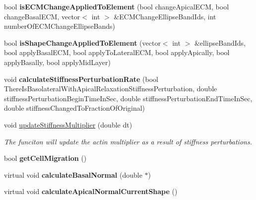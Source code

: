 \begin{DoxyCompactItemize}
\item 
\hypertarget{classShapeBase_accfdf899a255100c440aed31c8ec53e4}{}bool {\bfseries is\+E\+C\+M\+Change\+Applied\+To\+Element} (bool change\+Apical\+E\+C\+M, bool change\+Basal\+E\+C\+M, vector$<$ int $>$ \&E\+C\+M\+Change\+Ellipse\+Band\+Ids, int number\+Of\+E\+C\+M\+Change\+Ellipse\+Bands)\label{classShapeBase_accfdf899a255100c440aed31c8ec53e4}

\item 
\hypertarget{classShapeBase_ab46031b73b9f1054d56b26e3b3135a75}{}bool {\bfseries is\+Shape\+Change\+Applied\+To\+Element} (vector$<$ int $>$ \&ellipse\+Band\+Ids, bool apply\+Basal\+E\+C\+M, bool apply\+To\+Lateral\+E\+C\+M, bool apply\+Apically, bool apply\+Basally, bool apply\+Mid\+Layer)\label{classShapeBase_ab46031b73b9f1054d56b26e3b3135a75}

\item 
\hypertarget{classShapeBase_aef460b84dc469f89742af7c19411454f}{}void {\bfseries calculate\+Stiffness\+Perturbation\+Rate} (bool There\+Is\+Basolateral\+With\+Apical\+Relaxation\+Stiffness\+Perturbation, double stiffness\+Perturbation\+Begin\+Time\+In\+Sec, double stiffness\+Perturbation\+End\+Time\+In\+Sec, double stiffness\+Changed\+To\+Fraction\+Of\+Original)\label{classShapeBase_aef460b84dc469f89742af7c19411454f}

\item 
\hypertarget{classShapeBase_a4eb97c0c1a988e77126809745b191c02}{}void \hyperlink{classShapeBase_a4eb97c0c1a988e77126809745b191c02}{update\+Stiffness\+Multiplier} (double dt)\label{classShapeBase_a4eb97c0c1a988e77126809745b191c02}

\begin{DoxyCompactList}\small\item\em The funciton will update the actin multiplier as a result of stiffness perturbations. \end{DoxyCompactList}\item 
\hypertarget{classShapeBase_ae9c2033249b0390ac5b2e05b6c88652a}{}bool {\bfseries get\+Cell\+Migration} ()\label{classShapeBase_ae9c2033249b0390ac5b2e05b6c88652a}

\item 
\hypertarget{classShapeBase_aa9492c37ca1f7c01a72808215954ff8a}{}virtual void {\bfseries calculate\+Basal\+Normal} (double $\ast$)\label{classShapeBase_aa9492c37ca1f7c01a72808215954ff8a}

\item 
\hypertarget{classShapeBase_a82400cae7963721655c867547caf6a76}{}virtual void {\bfseries calculate\+Apical\+Normal\+Current\+Shape} ()\label{classShapeBase_a82400cae7963721655c867547caf6a76}


\end{DoxyCompactItemize}
